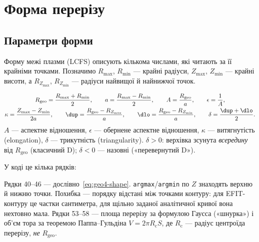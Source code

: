 \chapter{Форма перерізу}\label{ch:geo4}

\section{Параметри форми}\label{sec:geo4-params}

Форму межі плазми (LCFS) описують кількома числами, які читають за її крайніми точками. Позначимо $R_{\max}$, $R_{\min}$ --- крайні радіуси, $Z_{\max}$, $Z_{\min}$ --- крайні висоти, а $R_{Z_{\max}}$, $R_{Z_{\min}}$ --- радіуси найвищої й найнижчої точок.

\begin{outofcorpus}
\begin{equation}\label{eq:geo4-shape}
\begin{gathered}
R_{\mathrm{geo}}=\frac{R_{\max}+R_{\min}}2,\qquad a=\frac{R_{\max}-R_{\min}}2,\qquad A=\frac{R_{\mathrm{geo}}}a,\qquad \epsilon=\frac1A,\\
\kappa=\frac{Z_{\max}-Z_{\min}}{2a},\qquad \dup=\frac{R_{\mathrm{geo}}-R_{Z_{\max}}}a,\qquad \dlo=\frac{R_{\mathrm{geo}}-R_{Z_{\min}}}a,\qquad \delta=\frac{\dup+\dlo}2 .
\end{gathered}
\end{equation}
$A$ --- аспектне відношення, $\epsilon$ --- обернене аспектне відношення, $\kappa$ --- витягнутість (elongation), $\delta$ --- трикутність (triangularity). $\delta>0$: верхівка зсунута \emph{всередину} від $R_{\mathrm{geo}}$ (класичний D); $\delta<0$ --- назовні («перевернутий D»).
\end{outofcorpus}

У коді це кілька рядків:


\noindent Рядки 40--46 --- дослівно~\eqref{eq:geo4-shape}. \texttt{argmax}/\texttt{argmin} по $Z$ знаходять верхню й нижню точки. Похибка --- порядку відстані між точками контуру: для EFIT-контуру це частки сантиметра, для щільно заданої аналітичної кривої вона нехтовно мала. Рядки 53--58 --- площа перерізу за формулою Гаусса («шнурка») і об'єм тора за теоремою Паппа--Гульдіна $V=2\pi R_{\mathrm c}S$, де $R_{\mathrm c}$ --- радіус центроїда перерізу, \emph{не} $R_{\mathrm{geo}}$.

